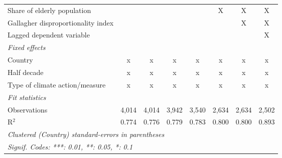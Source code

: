 \begin{table}[htbp]
\begin{tabular}{lccccccc}
      Share of elderly population                                      &               &              &               &         & X             & X             & X\\  
      Gallagher disproportionality index                               &               &              &               &         &               & X             & X\\  
      Lagged dependent variable                                        &               &              &               &         &               &               & X\\  
      \emph{Fixed effects}\\
      Country                                                          & x             & x            & x             & x       & x             & x             & x\\  
      Half decade                                                      & x             & x            & x             & x       & x             & x             & x\\  
      Type of climate action/measure                                   & x             & x            & x             & x       & x             & x             & x\\  
      \midrule \emph{Fit statistics}\\
      Observations                                                     & 4,014         & 4,014        & 3,942         & 3,540   & 2,634         & 2,634         & 2,502\\  
      R$^2$                                                            & 0.774         & 0.776        & 0.779         & 0.783   & 0.800         & 0.800         & 0.893\\  
      \midrule
      \multicolumn{8}{l}{\emph{Clustered (Country) standard-errors in parentheses}}\\
      \multicolumn{8}{l}{\emph{Signif. Codes: ***: 0.01, **: 0.05, *: 0.1}}\\
   \end{tabular}
\end{table}


